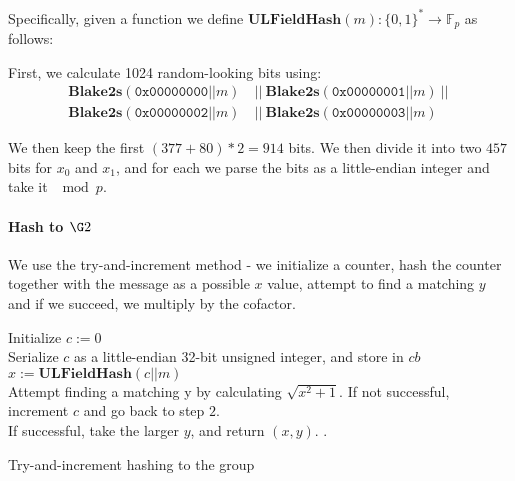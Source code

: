 \documentclass[11pt]{article}
\numberwithin{figure}{section} %
\newcommand{\Fp}{\ensuremath{\mathbb{F}_p}\xspace}
\newcommand{\bhash}{\ensuremath{\mathbf{Blake2s}}\xspace}
\newcommand{\ulfieldhash}{\ensuremath{\mathbf{ULFieldHash}}\xspace}
\begin{document}
Specifically, given a function we define $\ulfieldhash(m): \{0,1\}^* \rightarrow \Fp$ as follows:

First, we calculate 1024 random-looking bits using:
\begin{align*}
\bhash(\texttt{0x00000000} || m) &\ ||\ \bhash(\texttt{0x00000001} || m)\ ||\ \\
\bhash(\texttt{0x00000002} || m) &\ ||\ \bhash(\texttt{0x00000003} || m)
\end{align*}

We then keep the first $(377+80)*2=914$ bits. We then divide it into two $457$ bits for $x_0$ and $x_1$, and for each we parse the bits as a little-endian integer and take it $\mod p$.

\paragraph{Hash to $\G2$}
We use the try-and-increment method - we initialize a counter, hash the counter together with the message as a possible $x$ value, attempt to find a matching $y$ and if we succeed, we multiply by the cofactor.

\begin{algorithm}
	
	Initialize $c := 0$ \\
	Serialize $c$ as a little-endian 32-bit unsigned integer, and store in $cb$ \\
	$x := \ulfieldhash(c || m)$ \\
	Attempt finding a matching y by calculating $\sqrt{x^2 + 1}$. If not successful, increment $c$ and go back to step $2$. \\
	If successful, take the larger $y$, and return $(x, y)$.
	.
	
	\caption{Try-and-increment hashing to the group}
\end{algorithm}




\end{document}
